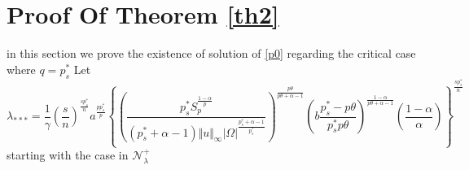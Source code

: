 \documentclass[10pt,twoside,reqno,centertags,draft]{amsart}
\begin{document}
\section{Proof Of Theorem \ref{th2}}
in this section we prove the existence of solution of \ref{p0} regarding the critical case where $ q =p_s^*$\newline
Let
{\tiny
\begin{equation}
\lambda_{***} =\frac{1}{\gamma}\left( \frac{s}{n}\right)^{\frac{s p_s^*}{n}} a^{\frac{pp_s^*}{p}}\left\lbrace \left(\frac{p_s^* S_{p}^{\frac{1 -\alpha}{p}}}{(p_s^* +\alpha -1)\Vert u\Vert_{\infty}\vert \Omega\vert^{\frac{p_s^* +\alpha -1}{p_s^*}}}\right)^{\frac{p\theta}{p\theta +\alpha -1}}\left( b\frac{p_s^* -p\theta}{p_s^* p\theta}\right)^{\frac{1 -\alpha}{p\theta +\alpha -1}}\left( \frac{1 -\alpha}{\alpha}\right)\right\rbrace^{\frac{s p_s^*}{n}}
\end{equation}
}
starting with the case in $ \mathcal{N}_{\lambda}^{+}$
\end{document}
